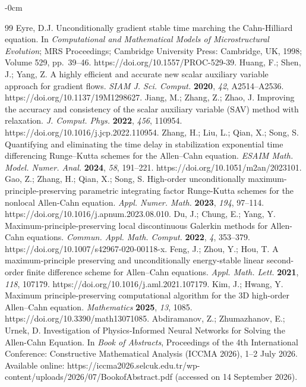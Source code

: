 \documentclass[symmetry,article,submit,moreauthors]{Definitions/mdpi}
\begin{document}
\begin{adjustwidth}{-\extralength}{0cm}
\begin{thebibliography}{99}
 Eyre, D.J. Unconditionally gradient stable time marching the Cahn-Hilliard equation. In \textit{Computational and Mathematical Models of Microstructural Evolution}; MRS Proceedings; Cambridge University Press: Cambridge, UK, 1998; Volume 529, pp.\ 39--46. https://doi.org/10.1557/PROC-529-39.
 Huang, F.; Shen, J.; Yang, Z. A highly efficient and accurate new scalar auxiliary variable approach for gradient flows. \textit{SIAM J. Sci. Comput.} \textbf{2020}, \textit{42}, A2514--A2536. https://doi.org/10.1137/19M1298627.
 Jiang, M.; Zhang, Z.; Zhao, J. Improving the accuracy and consistency of the scalar auxiliary variable (SAV) method with relaxation. \textit{J. Comput. Phys.} \textbf{2022}, \textit{456}, 110954. https://doi.org/10.1016/j.jcp.2022.110954.
 Zhang, H.; Liu, L.; Qian, X.; Song, S. Quantifying and eliminating the time delay in stabilization exponential time differencing Runge--Kutta schemes for the Allen--Cahn equation. \textit{ESAIM Math. Model. Numer. Anal.} \textbf{2024}, \textit{58}, 191--221. https://doi.org/10.1051/m2an/2023101.
 Gao, Z.; Zhang, H.; Qian, X.; Song, S. High-order unconditionally maximum-principle-preserving parametric integrating factor Runge-Kutta schemes for the nonlocal Allen-Cahn equation. \textit{Appl. Numer. Math.} \textbf{2023}, \textit{194}, 97--114. https://doi.org/10.1016/j.apnum.2023.08.010.
 Du, J.; Chung, E.; Yang, Y. Maximum-principle-preserving local discontinuous Galerkin methods for Allen-Cahn equations. \textit{Commun. Appl. Math. Comput.} \textbf{2022}, \textit{4}, 353--379. https://doi.org/10.1007/s42967-020-00118-x.
 Feng, J.; Zhou, Y.; Hou, T. A maximum-principle preserving and unconditionally energy-stable linear second-order finite difference scheme for Allen--Cahn equations. \textit{Appl. Math. Lett.} \textbf{2021}, \textit{118}, 107179. https://doi.org/10.1016/j.aml.2021.107179.
 Kim, J.; Hwang, Y. Maximum principle-preserving computational algorithm for the 3D high-order Allen--Cahn equation. \textit{Mathematics} \textbf{2025}, \textit{13}, 1085. https://doi.org/10.3390/math13071085.
 Abdiramanov, Z.; Zhumazhanov, E.; Urnek, D. Investigation of Physics-Informed Neural Networks for Solving the Allen-Cahn Equation. In \textit{Book of Abstracts}, Proceedings of the 4th International Conference: Constructive Mathematical Analysis (ICCMA 2026), 1--2 July 2026. Available online: https://iccma2026.selcuk.edu.tr/wp-content/uploads/2026/07/BookofAbstract.pdf (accessed on 14 September 2026).

\end{thebibliography}
\end{adjustwidth}
\end{document}
